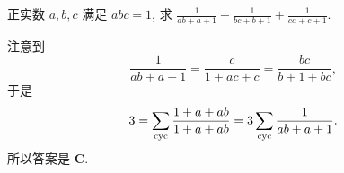\begin{prob}
\label{prob:prob-8}
正实数 $a, b, c$ 满足 $abc = 1$,
求 $\frac{1}{ab+a+1} + \frac{1}{bc+b+1} + \frac{1}{ca+c+1}$.
\end{prob}

\begin{soln}
注意到
\[
\frac{1}{ab+a+1} = \frac{c}{1+ac+c} = \frac{bc}{b+1+bc},
\]
于是
\[
3 = \sum_{\mathrm{cyc}} \frac{1+a+ab}{1+a+ab} = 3 \sum_{\mathrm{cyc}} \frac{1}{ab+a+1}.
\]
所以答案是 $\boxed{\textbf{C}.}$
\end{soln}
